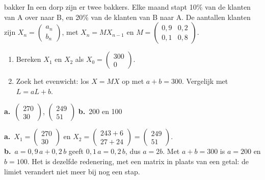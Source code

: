 \begin{oefeningen}
\begin{oefening}[2]
\begin{metprent}{bakker}
 In een dorp zijn er twee bakkers. Elke maand stapt 10\% van de klanten van A over naar B, en 20\% van de klanten van B naar A. De aantallen klanten zijn $X_n = \begin{pmatrix} a_n \\ b_n \end{pmatrix}$, met $X_{n} = M X_{n-1}$ en $M = \begin{pmatrix} 0{,}9 & 0{,}2 \\ 0{,}1 & 0{,}8 \end{pmatrix}$.
\begin{enumerate}
  \item Bereken $X_1$ en $X_2$ als $X_0 = \begin{pmatrix} 300 \\ 0 \end{pmatrix}$.
  \item Zoek het evenwicht: los $X = MX$ op met $a + b = 300$. Vergelijk met $L = aL + b$.
\end{enumerate}
\end{metprent}
\begin{solution}
\textbf{a.}~$\begin{pmatrix} 270 \\ 30 \end{pmatrix}$, $\begin{pmatrix} 249 \\ 51 \end{pmatrix}$ \quad \textbf{b.}~200 en 100
\end{solution}
\begin{fullsolution}
\textbf{a.}~$X_1=\begin{pmatrix} 270 \\ 30 \end{pmatrix}$ en $X_2=\begin{pmatrix} 243+6 \\ 27+24 \end{pmatrix}=\begin{pmatrix} 249 \\ 51 \end{pmatrix}$.\\
\textbf{b.}~$a=0{,}9\,a+0{,}2\,b$ geeft $0{,}1\,a=0{,}2\,b$, dus $a=2b$. Met $a+b=300$ is $a=200$ en $b=100$. Het is dezelfde redenering, met een matrix in plaats van een getal: de limiet verandert niet meer bij nog een stap.
\end{fullsolution}
\end{oefening}


\end{oefeningen}
